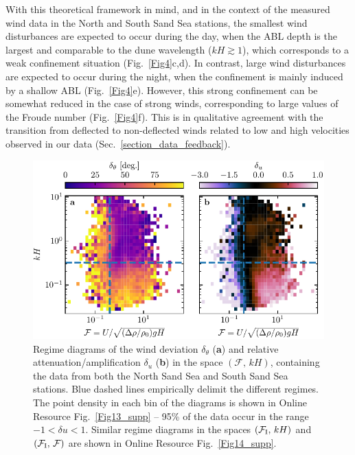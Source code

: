 With this theoretical framework in mind, and in the context of the measured wind data in the North and South Sand Sea stations, the smallest wind disturbances are expected to occur during the day, when the ABL depth is the largest and comparable to the dune wavelength ($k H \gtrsim 1$), which corresponds to a weak confinement situation (Fig.~\ref{Fig4}c,d). In contrast, large wind disturbances are expected to occur during the night, when the confinement is mainly induced by a shallow ABL (Fig.~\ref{Fig4}e). However, this strong confinement can be somewhat reduced in the case of strong winds, corresponding to large values of the Froude number (Fig.~\ref{Fig4}f). This is in qualitative agreement with the transition from deflected to non-deflected winds related to low and high velocities observed in our data (Sec.~\ref{section_data_feedback}).


\begin{figure}
\centering
\includegraphics[scale=1]{Figures/Figure5.pdf}
\caption{Regime diagrams of the wind deviation $\delta_{\theta}$ (\textbf{a}) and relative attenuation/amplification $\delta_{u}$ (\textbf{b}) in the space $(\mathcal{F}, \, kH)$, containing the data from both the North Sand Sea and South Sand Sea stations. Blue dashed lines empirically delimit the different regimes. The point density in each bin of the diagrams is shown in Online Resource Fig.~\ref{Fig13_supp} -- 95\% of the data occur in the range $-1 < \delta u < 1$. Similar regime diagrams in the spaces $(\mathcal{F}_{\textup{I}}, \, kH)$ and $(\mathcal{F}_{\textup{I}}, \, \mathcal{F})$ are shown in Online Resource Fig.~\ref{Fig14_supp}.}
\label{Fig5}
\end{figure}


